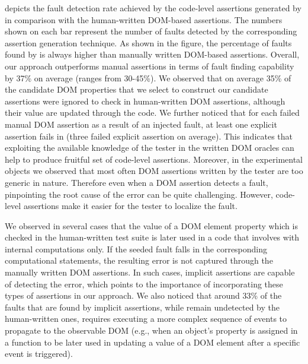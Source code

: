  depicts the fault detection rate achieved by the code-level assertions generated by \tool in comparison with the human-written DOM-based assertions. The numbers shown on each bar represent the number of faults detected by the corresponding assertion generation technique. As shown in the figure, the percentage of faults found by \tool is always higher than manually written DOM-based assertions. Overall, our approach outperforms manual assertions in terms of fault finding capability by 37\% on average (ranges from 30-45\%). We observed that on average 35\% of the candidate DOM properties that we select to construct our candidate assertions were ignored to check in human-written DOM assertions, although their value are updated through the \javascript code.
We further noticed that for each failed manual DOM assertion as a result of an injected fault, at least one explicit assertion fails in \tool (three failed explicit assertion on average). This indicates that exploiting the available knowledge of the tester in the written DOM oracles can help to produce fruitful set of code-level assertions. Moreover, in the experimental objects we observed that most often DOM assertions written by the tester are too generic in nature. Therefore even when a DOM assertion detects a \javascript fault, pinpointing the root cause of the error can be quite challenging. However, code-level assertions make it easier for the tester to localize the fault.

We observed in several cases that the value of a DOM element property which is checked in the human-written test suite is later used in a \javascript code that involves with internal computations only. If the seeded fault falls in the corresponding computational statements, the resulting error is not captured through the manually written DOM assertions. In such cases, implicit assertions are capable of detecting the error, which points to the importance of incorporating these types of assertions in our approach. We also noticed that around 33\% of the faults that are found by implicit assertions, while remain undetected by the human-written ones, requires executing a more complex sequence of events to propagate to the observable DOM (e.g., when an object's property is assigned in a function to be later used in updating a value of a DOM element after a specific event is triggered).    



